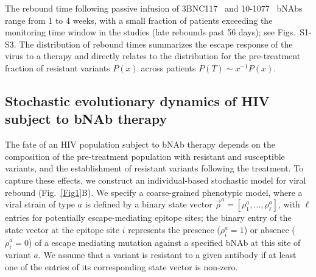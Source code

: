 \documentclass[aps,prx,noshowpacs,twocolumn,nofootinbib]{revtex4-2}
\begin{document}
The rebound time following passive infusion of  3BNC117~\cite{Caskey:2015hm} and 10-1077~\cite{Caskey:2017el} bNAbs range from 1 to 4 weeks, with a small fraction of patients exceeding the monitoring time window in the studies (late rebounds past 56 days);  see Figs.~S1-S3. The distribution of rebound times summarizes the escape response of the virus to a therapy and directly relates to the distribution for the pre-treatment fraction of resistant variants $P(x)$ across patients $P(T) \sim x^{-1} P(x)$. 


\subsection*{Stochastic evolutionary dynamics of HIV subject to bNAb therapy}
The fate of an HIV population subject to bNAb therapy depends on the composition of  the pre-treatment population with resistant and susceptible variants, and the establishment of resistant variants following the treatment. To capture these effects, we construct an individual-based stochastic model for viral rebound (Fig.~\ref{Fig1}B). We specify a coarse-grained phenotypic model, where a viral strain of type $a$ is defined by a binary state vector $\vec \rho^a = [\rho^a_1,\dots,\rho^a_\ell]$, with $\ell$ entries for potentially escape-mediating epitope sites; the binary entry of the state vector at the epitope site $i$ represents the presence ($\rho^a_i=1$) or absence ($\rho^a_i=0$)  of a escape mediating mutation against a specified bNAb at this site of  variant $a$. We assume that a variant is resistant to a given antibody if at least one of the entries of its corresponding state vector is non-zero.
\end{document}
